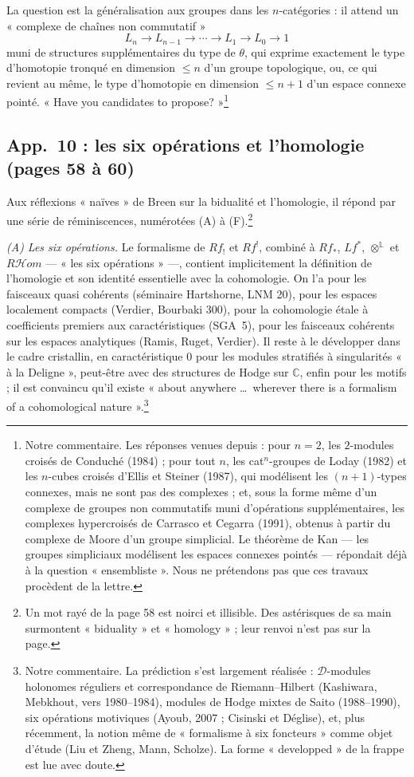 \documentclass[11pt,a4paper]{article}
\begin{document}
La question est la généralisation aux groupes dans les $n$-catégories :
il attend un « complexe de chaînes non commutatif »
\[
L_n \to L_{n-1} \to \cdots \to L_1 \to L_0 \to 1
\]
muni de structures supplémentaires du type de $\theta$, qui exprime
exactement le type d'homotopie tronqué en dimension $\leqslant n$ d'un groupe
topologique, ou, ce qui revient au même, le type d'homotopie en dimension
$\leqslant n+1$ d'un espace connexe pointé. « Have you candidates to
propose? »\footnote{Notre commentaire. Les réponses venues depuis :
pour $n = 2$, les $2$-modules croisés de Conduché (1984) ; pour tout $n$, les
cat$^n$-groupes de Loday (1982) et les $n$-cubes croisés d'Ellis et Steiner
(1987), qui modélisent les $(n+1)$-types connexes, mais ne sont pas des
complexes ; et, sous la forme même d'un complexe de groupes non commutatifs
muni d'opérations supplémentaires, les complexes hypercroisés de Carrasco et
Cegarra (1991), obtenus à partir du complexe de Moore d'un groupe
simplicial. Le théorème de Kan --- les groupes simpliciaux modélisent les
espaces connexes pointés --- répondait déjà à la question « ensembliste ».
Nous ne prétendons pas que ces travaux procèdent de la lettre.}

\subsection*{App.~10 : les six opérations et l'homologie (pages 58 à 60)}

Aux réflexions « naïves » de Breen sur la bidualité et l'homologie, il
répond par une série de réminiscences, numérotées (A) à (F).\footnote{Un
mot rayé de la page 58 est noirci et illisible. Des astérisques de sa main
surmontent « biduality » et « homology » ; leur renvoi n'est pas sur la
page.}

\emph{(A) Les six opérations.} Le formalisme de $Rf_!$ et $Rf^!$, combiné à
$Rf_*$, $Lf^*$, $\otimes^{\mathbb{L}}$ et $R\mathcal{H}om$ --- « les six
opérations » ---, contient implicitement la définition de l'homologie et
son identité essentielle avec la cohomologie. On l'a pour les faisceaux
quasi cohérents (séminaire Hartshorne, LNM 20), pour les espaces
localement compacts (Verdier, Bourbaki 300), pour la cohomologie étale à
coefficients premiers aux caractéristiques (SGA~5), pour les faisceaux
cohérents sur les espaces analytiques (Ramis, Ruget, Verdier). Il reste à le
développer dans le cadre cristallin, en caractéristique $0$ pour les modules
stratifiés à singularités « à la Deligne », peut-être avec des structures de
Hodge sur $\mathbb{C}$, enfin pour les motifs ; il est convaincu qu'il existe
« about anywhere \ldots\ wherever there is a formalism of a cohomological
nature ».\footnote{Notre commentaire. La prédiction s'est largement
réalisée : $\mathcal{D}$-modules holonomes réguliers et correspondance de
Riemann--Hilbert (Kashiwara, Mebkhout, vers 1980--1984), modules de Hodge
mixtes de Saito (1988--1990), six opérations motiviques (Ayoub, 2007 ;
Cisinski et Déglise), et, plus récemment, la notion même de « formalisme à six
foncteurs » comme objet d'étude (Liu et Zheng, Mann, Scholze). La forme
« developped » de la frappe est lue avec doute.}
\end{document}
